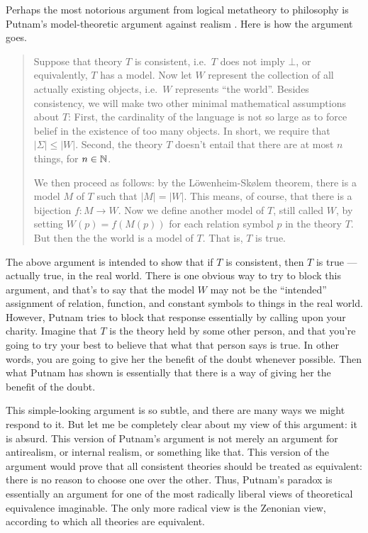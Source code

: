 Perhaps the most notorious argument from logical metatheory to
philosophy is Putnam's model-theoretic argument against realism
\citep{putnam1977,putnam-models}.  Here is how the argument goes.
\begin{quote}
  Suppose that theory $T$ is consistent, i.e.\ $T$ does not imply
  $\bot$, or equivalently, $T$ has a model.  Now let $W$ represent the
  collection of all actually existing objects, i.e.\ $W$ represents
  ``the world''.  Besides consistency, we will make two other minimal
  mathematical assumptions about $T$: First, the cardinality of the
  language is not so large as to force belief in the existence of too
  many objects.  In short, we require that $|\Sigma |\leq |W|$.
  Second, the theory $T$ doesn't entail that there are at most $n$
  things, for $n\in\mathbb N$.

  We then proceed as follows: by the L{\"o}wenheim-Sk{\o}lem theorem,
  there is a model $M$ of $T$ such that $|M|=|W|$.  This means, of
  course, that there is a bijection $f:M\to W$.  Now we define another
  model of $T$, still called $W$, by setting $W(p)=f(M(p))$ for each
  relation symbol $p$ in the theory $T$.  But then the the world is a
  model of $T$.  That is, $T$ is true. \end{quote}
The above argument is intended to show that if $T$ is consistent, then
$T$ is true --- actually true, in the real world.  There is one
obvious way to try to block this argument, and that's to say that the
model $W$ may not be the ``intended'' assignment of relation,
function, and constant symbols to things in the real world.  However,
Putnam tries to block that response essentially by calling upon your
charity.  Imagine that $T$ is the theory held by some other person,
and that you're going to try your best to believe that what that
person says is true.  In other words, you are going to give her the
benefit of the doubt whenever possible.  Then what Putnam has shown is
essentially that there is a way of giving her the benefit of the
doubt.

This simple-looking argument is so subtle, and there are many ways we
might respond to it.  But let me be completely clear about my view of
this argument: it is absurd.  This version of Putnam's argument is not
merely an argument for antirealism, or internal realism, or something
like that.  This version of the argument would prove that all
consistent theories should be treated as equivalent: there is no
reason to choose one over the other.  Thus, Putnam's paradox is
essentially an argument for one of the most radically liberal views of
theoretical equivalence imaginable.  The only more radical view is the
Zenonian view, according to which all theories are equivalent.

